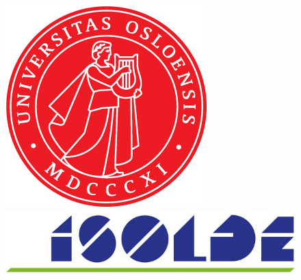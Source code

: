 \documentclass[twoside,english]{uiofysmaster/uiofysmaster}
\begin{document}
\begin{acknowledgements}
\begin{figure}[h]
	\begin{minipage}[b]{0.25\linewidth}
	\centering
		\includegraphics[width=\textwidth]{uiofysmaster/figures/apollonseglet/Apollonseglet/UiO_Segl_150dpi.png}
	\end{minipage}
	\hspace{4.8cm}
	\begin{minipage}[b]{0.45\linewidth}
	\centering
		\includegraphics[width=\textwidth]{Images/ISOLDE-logo.png}
	\end{minipage}
\end{figure}


\end{acknowledgements}


\tableofcontents

\end{document}

